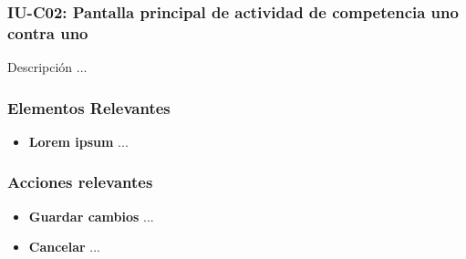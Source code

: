 
\subsubsection{IU-C02: Pantalla principal de actividad de competencia uno contra uno}

 Descripción ...


\subsubsection{Elementos Relevantes}

    \begin{itemize}
    \item {\bf Lorem ipsum}
        ...
    \end{itemize}

\subsubsection{Acciones relevantes}

    \begin{itemize}
    \item {\bf Guardar cambios}
        ...

    \item {\bf Cancelar}
        ...
    \end{itemize}

\clearpage
